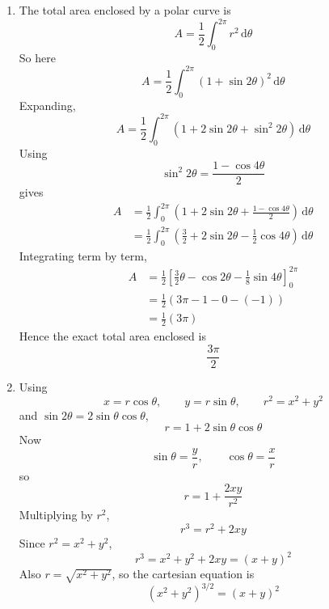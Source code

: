 \documentclass[leqno]{article}
\begin{document}
\begin{enumerate}[
	  label=\textbf{\arabic*.},
	  leftmargin=*,
	  topsep=0pt,
	  partopsep=0pt,
	  parsep=0pt
	]
\begin{tcolorbox}[colback=white, colframe=scarlet, title={\textbf{Solution}}, breakable, grow to left by=6mm, grow to right by=10mm]
\begin{enumerate}[label=\textbf{(\alph*)}]
	  \item The total area enclosed by a polar curve is
	  \[
	  A=\frac12\int_0^{2\pi} r^2\,\mathrm{d}\theta
	  \]
	  So here
	  \[
	  A=\frac12\int_0^{2\pi}(1+\sin 2\theta)^2\,\mathrm{d}\theta
	  \]
	  Expanding,
	  \[
	  A=\frac12\int_0^{2\pi}\left(1+2\sin 2\theta+\sin^2 2\theta\right)\,\mathrm{d}\theta
	  \]
	  Using
	  \[
	  \sin^2 2\theta=\frac{1-\cos 4\theta}{2}
	  \]
	  gives
	  \begin{align*}
	  A&=\frac12\int_0^{2\pi}\left(1+2\sin 2\theta+\frac{1-\cos 4\theta}{2}\right)\,\mathrm{d}\theta \\
	   &=\frac12\int_0^{2\pi}\left(\frac32+2\sin 2\theta-\frac12\cos 4\theta\right)\,\mathrm{d}\theta
	  \end{align*}
	  Integrating term by term,
	  \begin{align*}
	  A&=\frac12\left[\frac32\theta-\cos 2\theta-\frac18\sin 4\theta\right]_0^{2\pi} \\
	   &=\frac12\left(3\pi-1-0-(-1)\right) \\
	   &=\frac12(3\pi)
	  \end{align*}
	  Hence the exact total area enclosed is
	  \[
	  \frac{3\pi}{2}
	  \]
	
	  \item Using
	  \[
	  x=r\cos\theta,\qquad y=r\sin\theta,\qquad r^2=x^2+y^2
	  \]
	  and \(\sin 2\theta=2\sin\theta\cos\theta\),
	  \[
	  r=1+2\sin\theta\cos\theta
	  \]
	  Now
	  \[
	  \sin\theta=\frac{y}{r},\qquad \cos\theta=\frac{x}{r}
	  \]
	  so
	  \[
	  r=1+\frac{2xy}{r^2}
	  \]
	  Multiplying by \(r^2\),
	  \[
	  r^3=r^2+2xy
	  \]
	  Since \(r^2=x^2+y^2\),
	  \[
	  r^3=x^2+y^2+2xy=(x+y)^2
	  \]
	  Also \(r=\sqrt{x^2+y^2}\), so the cartesian equation is
	  \[
	  (x^2+y^2)^{3/2}=(x+y)^2
	  \]
	\end{enumerate}
	\end{tcolorbox}
	
	
	\end{enumerate}
	
\end{document}
